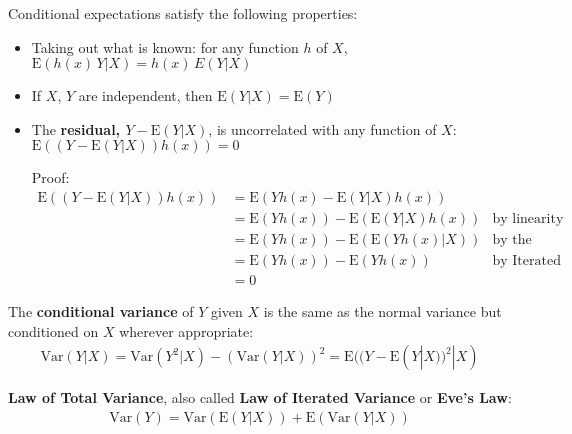 \documentclass[a4paper,10pt]{article}
\newcommand{\E}{\mathrm{E}}
\newcommand{\Var}{\mathrm{Var}}
\begin{document}
Conditional expectations satisfy the following properties:
\begin{itemize}
    \item Taking out what is known: for any function $h$ of $X$, $\E(h(x)\,Y|X) = h(x)\,E(Y|X)$
    \item If $X$, $Y$ are independent, then $\E(Y|X) = \E(Y)$
    \item The \textbf{residual, $Y-\E(Y|X)$}, is uncorrelated with any function of $X$: $\E((Y-\E(Y|X))h(x)) = 0$ 
        
        Proof:
        \begin{align*}
            \E((Y-\E(Y|X))h(x)) &= \E(Yh(x) - \E(Y|X)h(x)) \\
            &= \E(Yh(x)) - \E(\E(Y|X)h(x)) &\text{by linearity} \\
            &= \E(Yh(x)) - \E(\E(Yh(x)|X)) &\text{by the reverse of the first property} \\
            &= \E(Yh(x)) - \E(Yh(x)) &\text{by Iterated Expectation} \\
            &= 0
        \end{align*}
\end{itemize}

The \textbf{conditional variance} of $Y$ given $X$ is the same as the normal variance but conditioned on $X$ wherever appropriate:
\begin{align*}
    \Var(Y|X) = \Var(Y^2|X) - (\Var(Y|X))^2 = \E((Y-\E(Y|X))^2|X)
\end{align*}

\textbf{Law of Total Variance}, also called \textbf{Law of Iterated Variance} or \textbf{Eve's Law}:
\begin{align*}
    \Var(Y) = \Var(\E(Y|X)) + \E(\Var(Y|X))
\end{align*}
\end{document}
